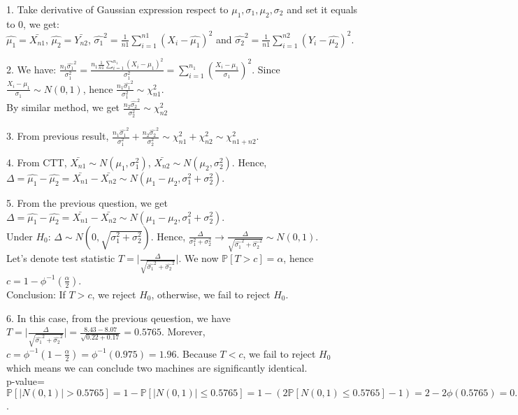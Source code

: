 \documentclass[10pt]{article}
\newenvironment{problem}[2][Problem]{\begin{trivlist}
\item[\hskip \labelsep {\bfseries #1}\hskip \labelsep {\bfseries #2.}]}{\end{trivlist}}
\begin{document}
\begin{problem}{2}
\item 1.
Take derivative of Gaussian expression respect to $\mu_1, \sigma_1, \mu_2, \sigma_2$ and set it equals to 0, we get:\\
$\hat{\mu_1}=\bar{X_{n1}}$, $\hat{\mu_2}=\bar{Y_{n2}}$, $\hat{\sigma_1}^2=\frac{1}{n1}\sum_{i=1}^{n1} (X_i-\hat{\mu_1})^2$ and $\hat{\sigma_2}^2=\frac{1}{n1}\sum_{i=1}^{n2} (Y_i-\hat{\mu_2})^2$.

\item 2.
We have: $\frac{n_1\hat{\sigma_1}^2}{\sigma_1^2}=\frac{n_1\frac{1}{n1}\sum_{i=1}^{n_1} (X_i-\mu_1)^2}{\sigma_1^2}=\sum_{i=1}^{n_1}(\frac{X_i-\mu_1}{\sigma_1})^2$. Since $\frac{X_i-\mu_1}{\sigma_1}\sim N(0,1)$, hence $\frac{n_1\hat{\sigma_1}^2}{\sigma_1^2} \sim \chi_{n1}^2$.\\
By similar method, we get $\frac{n_2\hat{\sigma_2}^2}{\sigma_2^2} \sim \chi_{n2}^2$






\item 3.
From previous result, $\frac{n_1\hat{\sigma_1}^2}{\sigma_1^2} + \frac{n_2\hat{\sigma_2}^2}{\sigma_2^2} \sim \chi_{n1}^2 + \chi_{n2}^2 \sim \chi_{n1+n2}^2$.


\item 4.
From CTT, $\bar{X_{n1}} \sim N(\mu_1, \sigma_1^2)$, $\bar{X_{n2}} \sim N(\mu_2, \sigma_2^2)$. Hence, $\Delta=\hat{\mu_1}-\hat{\mu_2}=\bar{X_{n1}}- \bar{X_{n2}} \sim N(\mu_1-\mu_2, \sigma_1^2+\sigma_2^2)$.


\item 5.
From the previous question, we get $\Delta=\hat{\mu_1}-\hat{\mu_2}=\bar{X_{n1}}- \bar{X_{n2}} \sim N(\mu_1-\mu_2, \sigma_1^2+\sigma_2^2)$.\\
Under $H_0$: $\Delta \sim N(0,\sqrt{ \sigma_1^2+\sigma_2^2})$. Hence, $\frac{\Delta}{\sigma_1^2+\sigma_2^2} \rightarrow \frac{\Delta}{\sqrt{\hat{\sigma_1}^2 + \hat{\sigma_2}^2}} \sim N(0,1)$.\\
Let's denote test statistic $T=\Big | \frac{\Delta}{\sqrt{\hat{\sigma_1}^2 + \hat{\sigma_2}^2}}\Big |$. We now $\mathbb{P}[T > c]=\alpha$, hence $c=1-\phi^{-1}(\frac{\alpha}{2})$.\\
Conclusion: If $T>c$, we reject $H_0$, otherwise, we fail to reject $H_0$.


\item 6.
In this case, from the previous qeuestion, we have $T=\Big | \frac{\Delta}{\sqrt{\hat{\sigma_1}^2 + \hat{\sigma_2}^2}}\Big |=\frac{8.43-8.07}{\sqrt{0.22+0.17}}=0.5765$. Morever, $c=\phi^{-1}(1-\frac{\alpha}{2})=\phi^{-1}(0.975)=1.96$. Because $T<c$, we fail to reject $H_0$ which means we can conclude two machines are significantly identical.\\
p-value=$\mathbb{P}[|N(0,1)|>0.5765]=1-\mathbb{P}[|N(0,1)| \leqslant 0.5765]=1-(2\mathbb{P}[N(0,1) \leqslant 0.5765]-1)=2-2\phi(0.5765)=0.5642$.




\end{problem}
\end{document}
